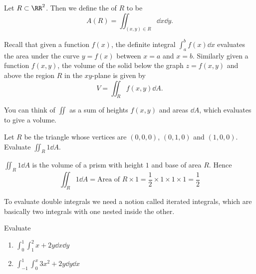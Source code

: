 \begin{definition}
Let $R\subset\RR^2$. Then we define the  of $R$ to be
\[ A(R)=\iint_{(x,y)\in R}\dd{x}\dd{y}. \]
\end{definition}


Recall that given a function $f(x)$, the definite integral $\int_a^bf(x)\dd{x}$ evaluates the area under the curve $y=f(x)$ between $x=a$ and $x=b$. Similarly given a function $f(x,y)$, the volume of the solid below the graph $z=f(x,y)$ and above the region $R$ in the $xy$-plane is given by 
\begin{equation}
V=\iint_Rf(x,y)\dd{A}.
\end{equation}

\begin{remark}
You can think of $\iint$ as a sum of heights $f(x,y)$ and areas $\dd{A}$, which evaluates to give a volume.
\end{remark}

\begin{exercise}{}{}
Let $R$ be the triangle whose vertices are $(0,0,0)$, $(0,1,0)$ and $(1,0,0)$. Evaluate $\iint_R1\dd{A}$.
\end{exercise}

\begin{solution}
$\iint_R1\dd{A}$ is the volume of a prism with height $1$ and base of area $R$. Hence
\[ \iint_R1\dd{A}=\text{Area of }R\times1=\frac{1}{2}\times1\times1\times1=\boxed{\frac{1}{2}} \]
\end{solution}

To evaluate double integrals we need a notion called iterated integrals, which are basically two integrals with one nested inside the other.

\begin{exercise}{}{}
Evaluate 
\begin{enumerate}[label=(\alph*)]
\item $\displaystyle\int_0^1\int_1^2x+2y\dd{x}\dd{y}$
\item $\displaystyle\int_{-1}^1\int_0^x3x^2+2y\dd{y}\dd{x}$
\end{enumerate}
\end{exercise}

